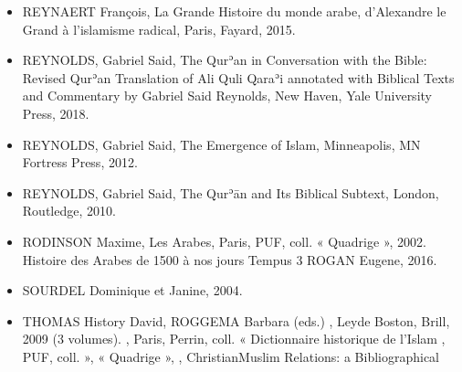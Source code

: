 \begin{itemize}
    \item REYNAERT François, La Grande Histoire du monde arabe, d'Alexandre le Grand à l'islamisme radical, Paris, Fayard, 2015.   \item REYNOLDS, Gabriel Said, The Qurʾan in Conversation with the Bible: Revised Qurʾan Translation of Ali Quli Qaraʾi annotated with Biblical Texts and Commentary by Gabriel Said Reynolds, New Haven, Yale University Press, 2018.   \item REYNOLDS, Gabriel Said, The Emergence of Islam, Minneapolis, MN Fortress Press, 2012.    \item REYNOLDS, Gabriel Said, The Qurʾān and Its Biblical Subtext, London, Routledge, 2010.   \item RODINSON Maxime, Les Arabes, Paris, PUF, coll. « Quadrige », 2002. Histoire des Arabes de 1500 à nos jours Tempus 3 ROGAN Eugene, 2016.   \item SOURDEL Dominique et Janine, 2004.   \item THOMAS History David, ROGGEMA Barbara (eds.) , Leyde  Boston, Brill, 2009 (3 volumes). , Paris, Perrin, coll. « Dictionnaire historique de l’Islam , PUF, coll. », « Quadrige », , ChristianMuslim Relations: a Bibliographical 
\end{itemize}